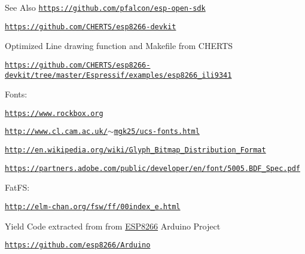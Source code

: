 \begin{DoxySeeAlso}{See Also}
\href{https://github.com/pfalcon/esp-open-sdk}{\tt https\-://github.\-com/pfalcon/esp-\/open-\/sdk} 

\href{https://github.com/CHERTS/esp8266-devkit}{\tt https\-://github.\-com/\-C\-H\-E\-R\-T\-S/esp8266-\/devkit}
\begin{DoxyItemize}
\item Optimized Line drawing function and Makefile from C\-H\-E\-R\-T\-S 
\end{DoxyItemize}

\href{https://github.com/CHERTS/esp8266-devkit/tree/master/Espressif/examples/esp8266_ili9341}{\tt https\-://github.\-com/\-C\-H\-E\-R\-T\-S/esp8266-\/devkit/tree/master/\-Espressif/examples/esp8266\-\_\-ili9341}
\begin{DoxyItemize}
\item Fonts\-: 
\end{DoxyItemize}

\href{https://www.rockbox.org}{\tt https\-://www.\-rockbox.\-org} 

\href{http://www.cl.cam.ac.uk/~mgk25/ucs-fonts.html}{\tt http\-://www.\-cl.\-cam.\-ac.\-uk/$\sim$mgk25/ucs-\/fonts.\-html} 

\href{http://en.wikipedia.org/wiki/Glyph_Bitmap_Distribution_Format}{\tt http\-://en.\-wikipedia.\-org/wiki/\-Glyph\-\_\-\-Bitmap\-\_\-\-Distribution\-\_\-\-Format} 

\href{https://partners.adobe.com/public/developer/en/font/5005.BDF_Spec.pdf}{\tt https\-://partners.\-adobe.\-com/public/developer/en/font/5005.\-B\-D\-F\-\_\-\-Spec.\-pdf}
\begin{DoxyItemize}
\item Fat\-F\-S\-: 
\end{DoxyItemize}

\href{http://elm-chan.org/fsw/ff/00index_e.html}{\tt http\-://elm-\/chan.\-org/fsw/ff/00index\-\_\-e.\-html}
\begin{DoxyItemize}
\item Yield Code extracted from from \hyperlink{user__config_8h_af917fb5672b9339e228304f59f3b250a}{E\-S\-P8266} Arduino Project 
\end{DoxyItemize}

\href{https://github.com/esp8266/Arduino}{\tt https\-://github.\-com/esp8266/\-Arduino} 


\end{DoxySeeAlso}

